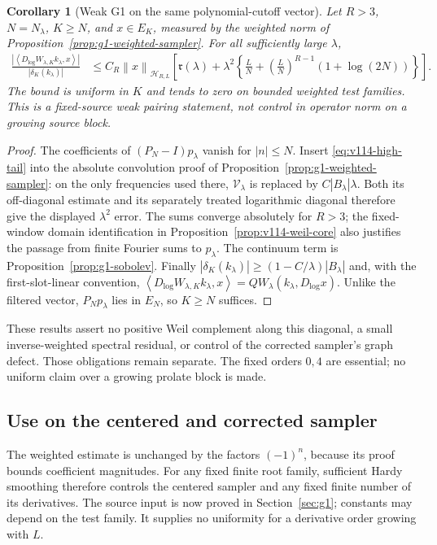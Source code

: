 \documentclass[11pt]{article}
\newtheorem{corollary}[theorem]{Corollary}
\theoremstyle{remark}
\newcommand{\norm}[1]{\left\lVert #1\right\rVert}
\newcommand{\ip}[2]{\left\langle #1,#2\right\rangle}
\begin{document}
\begin{corollary}[Weak G1 on the same polynomial-cutoff vector]
\label{cor:v114-polynomial-g1}
Let $R>3$, $N=N_\lambda$, $K\ge N$, and $x\in E_K$, measured by
the weighted norm of Proposition~\ref{prop:g1-weighted-sampler}.
For all sufficiently large $\lambda$,
\begin{align}
 \frac{|\ip{D_{\log}W_{\lambda,K}k_\lambda}{x}|}
      {|\delta_K(k_\lambda)|}
 &\le C_R\norm x_{\mathcal H_{R,L}}
 \left[\mathfrak r(\lambda)+\lambda^2
 \left\{\frac LN+\left(\frac LN\right)^{R-1}
                   (1+\log(2N))\right\}\right].
 \label{eq:v114-polynomial-g1}
\end{align}
The bound is uniform in $K$ and tends to zero on bounded weighted test
families. This is a fixed-source weak pairing statement, not control
in operator norm on a growing source block.
\end{corollary}
\begin{proof}
The coefficients of $(P_N-I)p_\lambda$ vanish for $|n|\le N$.
Insert \eqref{eq:v114-high-tail} into the absolute convolution proof
of Proposition~\ref{prop:g1-weighted-sampler}: on the only frequencies
used there, $\mathcal V_\lambda$ is replaced by $C|B_\lambda|\lambda$.
Both its off-diagonal estimate and its separately treated logarithmic
diagonal therefore give the displayed $\lambda^2$ error. The sums
converge absolutely for $R>3$; the fixed-window domain identification
in Proposition~\ref{prop:v114-weil-core} also justifies the passage
from finite Fourier sums to $p_\lambda$.
The continuum term is Proposition~\ref{prop:g1-sobolev}. Finally
$|\delta_K(k_\lambda)|\ge(1-C/\lambda)|B_\lambda|$ and, with the
first-slot-linear convention,
$\ip{D_{\log}W_{\lambda,K}k_\lambda}{x}
=QW_\lambda(k_\lambda,D_{\log}x)$.
Unlike the filtered vector, $P_Np_\lambda$ lies in $E_N$, so $K\ge N$
suffices.
\end{proof}

These results assert no positive Weil complement along this diagonal,
a small inverse-weighted spectral residual, or control of the corrected
sampler's graph defect. Those obligations remain separate. The fixed
orders $0,4$ are essential; no uniform claim over a growing prolate block
is made.

\subsection*{Use on the centered and corrected sampler}
The weighted estimate is unchanged by the factors $(-1)^n$, because its
proof bounds coefficient magnitudes. For any fixed finite root family,
sufficient Hardy smoothing therefore controls the centered sampler and
any fixed finite number of its derivatives. The source input is now
proved in Section~\ref{sec:g1}; constants may depend on the test family.
It supplies no uniformity for a derivative order growing with $L$.
\end{document}
